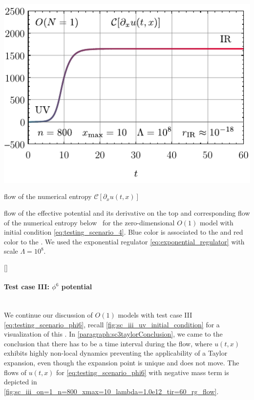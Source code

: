 	{
		\vspace{0.05cm}\includegraphics[width=\subcaptionFigureWidth-0.01cm]{0d/figures/sc_iv_on=1_n=800_xmax=10_lambda=1.0e8_tir=60_entropy_flow.pdf}
		\caption{\frg{} flow of the numerical entropy $\mathcal{C} [ \partial_x u ( t, x ) ]$}%
		\label{fig:sc_iv_on=1_n=800_xmax=10_lambda=1.0e8_tir=60_entropy_flow}%
	} %
	{%
		\caption{
			\frg{} flow of the effective potential and its derivative on the top  and corresponding flow of the numerical entropy below~ for the zero-dimensional $O(1)$ model with initial condition \eqref{eq:testing_scenario_4}.
			{Blue} color is associated to the \uv{} and {red} color to the \ir{}.
			We used the exponential regulator \cref{eq:exponential_regulator} with \uv{} scale $\Lambda = 10^8$.
		}\label{fig:sc_iv_on=1_n=800_xmax=10_lambda=1.0e8_tir=60}
	}%
	[]
\FloatBarrier
\paragraph{Test case III: \texorpdfstring{$\phi^6$}{phi**6} potential}\label{paragraph:sc3O1}\mbox{}\\%
We continue our discussion of $O(1)$ models with test case III \eqref{eq:testing_scenario_phi6}, recall \cref{fig:sc_iii_uv_initial_condition} for a visualization of this \ic{}.
In \cref{paragraph:sc3taylorConclusion}, we came to the conclusion that there has to be a time interval during the \frg{} flow, where $u ( t, x )$ exhibits highly non-local dynamics \dash{} preventing the applicability of a Taylor expansion, even though the expansion point is unique and does not move.
The \frg{} flows of $u ( t, x )$ for \eqref{eq:testing_scenario_phi6} with negative mass term is depicted in \cref{fig:sc_iii_on=1_n=800_xmax=10_lambda=1.0e12_tir=60_rg_flow}.

